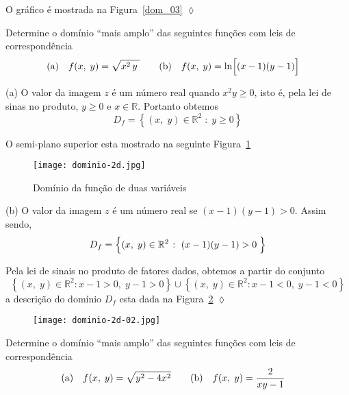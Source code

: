O gráfico é mostrada na Figura~\ref{dom_03} \hfill \(\lozenge\)

\begin{exer}
	Determine o domínio ``mais amplo'' das seguintes funções com leis de correspondência
	\begin{align*}
		\rm{(a)} & \quad  f(x,\; y)= \sqrt{x^{2}\,y\;}   \quad & \rm{(b)}& \quad f(x,\; y)= \ln\Bigl[(x-1)(y-1)\Bigr]
	\end{align*}
\end{exer}

\solo (a)  O valor da imagem \(z\) é um número real quando \(x^{2}y \geq 0\), isto é, pela lei de sinas no produto, \( y \geq 0\) e \( x \in \mathbb{R}\). Portanto obtemos
\begin{equation*}
	D_{f} = \left\{(x,\; y) \in \mathbb{R}^{2}\; \colon \; y \geq 0  \right\}
\end{equation*}

O semi-plano superior esta mostrado na seguinte Figura~\ref{fig:1-57} 
%
\begin{figure}[H]
	\centering
	\texttt{[image: dominio-2d.jpg]}
	\caption{Domínio da função de duas variáveis}
	\label{fig:1-57}
\end{figure}
%

(b)
O valor da imagem \(z\) é um número real  se \( (x-1)(y-1) > 0\). Assim sendo,
\begin{equation*}
	D_{f} = \Bigl\{(x,\; y) \in \mathbb{R}^{2}\; \colon\; (x-1)(y-1) > 0\; \Bigr\}
\end{equation*}

Pela lei de sinais no produto de fatores dados, obtemos a partir do conjunto  
\begin{equation*}
	\left\{(x,\; y)\in \mathbb{R}^{2}\colon x-1>0, \; y-1 > 0  \right\} \cup \left\{ (x,\; y)\in \mathbb{R}^{2}\colon x-1 < 0, \; y-1 < 0 \right\}
\end{equation*} 
a descrição do domínio \(D_{f}\) esta dada na Figura~\ref{fig:1-55} \hfill \(\lozenge\)
%
\begin{figure}[H]
	\centering
	\texttt{[image: dominio-2d-02.jpg]}
	\caption{}
	\label{fig:1-55}
\end{figure}
%

\begin{exer}
	Determine o domínio ``mais amplo'' das seguintes funções com leis de correspondência
	\begin{align*}
		\rm{(a)} & \quad  f(x,\; y)= \sqrt{y^{2}-4x^{2}}   \quad & \rm{(b)}& \quad f(x,\; y)= \dfrac{2}{xy-1}
	\end{align*}
\end{exer}

